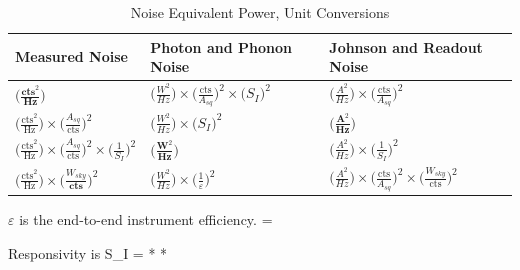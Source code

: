 \begin{longtable}{| l | l | l |}
\caption{Noise Equivalent Power, Unit Conversions} \label{NEP_table} \\
  \hline
  Measured Noise & Photon and Phonon Noise & Johnson and Readout Noise \\ \hline
  $\big( \frac{\textbf{cts}^2}{\textbf{Hz}} \big)$ & $\big( \frac{W^2}{Hz} \big) \times \big( \frac{\text{cts}}{A_{sq}} \big) ^2 \times \big( S_I \big) ^2$ & $\big( \frac{A^2}{Hz} \big) \times \big( \frac{\text{cts}}{A_{sq}} \big) ^2 $ \\ \hline
  $\big( \frac{\text{cts}^2}{\text{Hz}} \big) \times \big( \frac{A_{sq}}{\text{cts}} \big) ^2 $ & $\big( \frac{W^2}{Hz} \big) \times \big( S_I \big) ^2$ & $\big( \frac{\textbf{A}^2}{\textbf{Hz}} \big)$ \\ \hline
  $\big( \frac{\text{cts}^2}{\text{Hz}} \big) \times \big( \frac{A_{sq}}{\text{cts}} \big) ^2 \times \big( \frac{1}{S_I} \big) ^2$ & $\big( \frac{\textbf{W}^2}{\textbf{Hz}} \big)$ & $\big( \frac{A^2}{Hz} \big) \times \big( \frac{1}{S_I} \big) ^2$ \\ \hline
  $\big( \frac{\text{cts}^2}{\text{Hz}} \big) \times \big( \frac{W_{sky}}{\textbf{cts}} \big) ^2$ & $\big( \frac{W^2}{Hz} \big) \times \big( \frac{1}{\varepsilon} \big) ^2$ & $\big( \frac{A^2}{Hz} \big) \times \big( \frac{\text{cts}}{A_{sq}} \big) ^2 \times \big( \frac{W_{sky}}{\text{cts}} \big) ^2$ \\ \hline
\end{longtable}

$\varepsilon$ is the end-to-end instrument efficiency.
\be
\varepsilon = 
\label{eq:eff_ratio}
\ee

Responsivity is
\be
S_I =  *  * 
\label{eq:current_responsivity}
\ee


